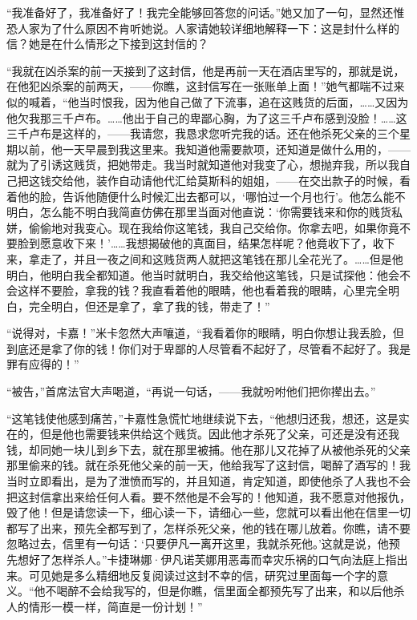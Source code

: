 \par “我准备好了，我准备好了！我完全能够回答您的问话。”她又加了一句，显然还惟恐人家为了什么原因不肯听她说。人家请她较详细地解释一下：这是封什么样的信？她是在什么情形之下接到这封信的？
\par “我就在凶杀案的前一天接到了这封信，他是再前一天在酒店里写的，那就是说，在他犯凶杀案的前两天，——你瞧，这封信写在一张账单上面！”她气都喘不过来似的喊着，“他当时恨我，因为他自己做了下流事，追在这贱货的后面，……又因为他欠我那三千卢布。……他出于自己的卑鄙心胸，为了这三千卢布感到没脸！……这三千卢布是这样的，——我请您，我恳求您听完我的话。还在他杀死父亲的三个星期以前，他一天早晨到我这里来。我知道他需要款项，还知道是做什么用的，——就为了引诱这贱货，把她带走。我当时就知道他对我变了心，想抛弃我，所以我自己把这钱交给他，装作自动请他代汇给莫斯科的姐姐，——在交出款子的时候，看着他的脸，告诉他随便什么时候汇出去都可以，‘哪怕过一个月也行’。他怎么能不明白，怎么能不明白我简直仿佛在那里当面对他直说：‘你需要钱来和你的贱货私姘，偷偷地对我变心。现在我给你这笔钱，我自己交给你。你拿去吧，如果你竟不要脸到愿意收下来！’……我想揭破他的真面目，结果怎样呢？他竟收下了，收下来，拿走了，并且一夜之间和这贱货两人就把这笔钱在那儿全花光了。……但是他明白，他明白我全都知道。他当时就明白，我交给他这笔钱，只是试探他：他会不会这样不要脸，拿我的钱？我直看着他的眼睛，他也看着我的眼睛，心里完全明白，完全明白，但还是拿了，拿了我的钱，带走了！”
\par “说得对，卡嘉！”米卡忽然大声嚷道，“我看着你的眼睛，明白你想让我丢脸，但到底还是拿了你的钱！你们对于卑鄙的人尽管看不起好了，尽管看不起好了。我是罪有应得的！”
\par “被告，”首席法官大声喝道，“再说一句话，——我就吩咐他们把你撵出去。”
\par “这笔钱使他感到痛苦，”卡嘉性急慌忙地继续说下去，“他想归还我，想还，这是实在的，但是他也需要钱来供给这个贱货。因此他才杀死了父亲，可还是没有还我钱，却同她一块儿到乡下去，就在那里被捕。他在那儿又花掉了从被他杀死的父亲那里偷来的钱。就在杀死他父亲的前一天，他给我写了这封信，喝醉了酒写的！我当时立即看出，是为了泄愤而写的，并且知道，肯定知道，即使他杀了人我也不会把这封信拿出来给任何人看。要不然他是不会写的！他知道，我不愿意对他报仇，毁了他！但是请您读一下，细心读一下，请细心一些，您就可以看出他在信里一切都写了出来，预先全都写到了，怎样杀死父亲，他的钱在哪儿放着。你瞧，请不要忽略过去，信里有一句话：‘只要伊凡一离开这里，我就杀死他。’这就是说，他预先想好了怎样杀人。”卡捷琳娜·伊凡诺芙娜用恶毒而幸灾乐祸的口气向法庭上指出来。可见她是多么精细地反复阅读过这封不幸的信，研究过里面每一个字的意义。“他不喝醉不会给我写的，但是你瞧，信里面全都预先写了出来，和以后他杀人的情形一模一样，简直是一份计划！”

